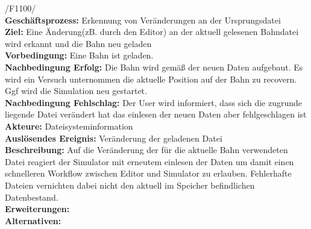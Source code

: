 /F1100/\\
\textbf{Geschäftsprozess:} Erkennung von Veränderungen an der Ursprungsdatei\\
\textbf{Ziel:} Eine Änderung(zB. durch den Editor) an der aktuell gelesenen Bahndatei wird erkannt und die Bahn neu geladen\\
\textbf{Vorbedingung:} Eine Bahn ist geladen.\\
\textbf{Nachbedingung Erfolg:} Die Bahn wird gemäß der neuen Daten aufgebaut. Es wird ein Versuch unternommen die aktuelle Position auf der Bahn zu recovern. Ggf wird die Simulation neu gestartet.\\
\textbf{Nachbedingung Fehlschlag:} Der User wird informiert, dass sich die zugrunde liegende Datei verändert hat das einlesen der neuen Daten aber fehlgeschlagen ist\\
\textbf{Akteure:} Dateisysteminformation\\
\textbf{Auslösendes Ereignis:} Veränderung der geladenen Datei\\
\textbf{Beschreibung:} Auf die Veränderung der für die aktuelle Bahn verwendeten Datei reagiert der Simulator mit erneutem einlesen der Daten um damit einen schnelleren Workflow zwischen Editor und Simulator zu erlauben. 
Fehlerhafte Dateien vernichten dabei nicht den aktuell im Speicher befindlichen Datenbestand.\\
\textbf{Erweiterungen:}\\
\textbf{Alternativen:}\\
